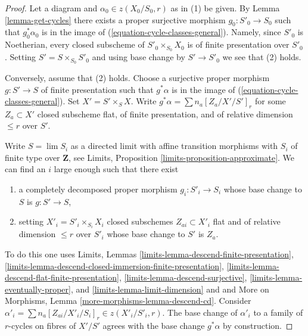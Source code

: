 \begin{proof}
Let a diagram and $\alpha_0 \in z(X_0/S_0, r)$ as in (1) be given.
By Lemma \ref{lemma-get-cycles} there exists a proper surjective
morphism $g_0 : S'_0 \to S_0$ such that $g_0^*\alpha_0$ is in
the image of (\ref{equation-cycle-classes-general}). Namely, since
$S'_0$ is Noetherian, every closed subscheme of $S'_0 \times_{S_0} X_0$
is of finite presentation over $S'_0$. Setting $S' = S \times_{S_0} S'_0$
and using base change by $S' \to S'_0$ we see that (2) holds.

\medskip\noindent
Conversely, assume that (2) holds. Choose a surjective proper morphism
$g : S' \to S$ of finite presentation such that $g^*\alpha$ is in the
image of (\ref{equation-cycle-classes-general}). Set $X' = S' \times_S X$.
Write $g^*\alpha = \sum n_a [Z_a/X'/S']_r$ for some $Z_a \subset X'$
closed subscheme flat, of finite presentation, and of relative dimension
$\leq r$ over $S'$.

\medskip\noindent
Write $S = \lim S_i$ as a directed limit with affine transition
morphisms with $S_i$ of finite type over $\mathbf{Z}$,
see Limits, Proposition \ref{limits-proposition-approximate}.
We can find an $i$ large enough such that there exist
\begin{enumerate}
\item a completely decomposed proper morphism $g_i : S'_i \to S_i$
whose base change to $S$ is $g : S' \to S$,
\item setting $X'_i = S'_i \times_{S_i} X_i$
closed subschemes $Z_{ai} \subset X'_i$ flat and of
relative dimension $\leq r$ over $S'_i$ whose base change to $S'$
is $Z_a$.
\end{enumerate}
To do this one uses Limits, Lemmas
\ref{limits-lemma-descend-finite-presentation},
\ref{limits-lemma-descend-closed-immersion-finite-presentation},
\ref{limits-lemma-descend-flat-finite-presentation},
\ref{limits-lemma-descend-surjective},
\ref{limits-lemma-eventually-proper}, and
\ref{limits-lemma-limit-dimension}
and
and More on Morphisms, Lemma
\ref{more-morphisms-lemma-descend-cd}.
Consider $\alpha'_i = \sum n_a [Z_{ai}/X'_i/S_i]_r \in z(X'_i/S'_i, r)$.
The base change of $\alpha'_i$ to a family of $r$-cycles on fibres
of $X'/S'$ agrees with the base change $g^*\alpha$ by construction.


\end{proof}
